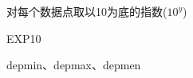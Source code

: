 \label{cmd:exp10}

对每个数据点取以10为底的指数($10^y$)

\begin{SACSTX}
EXP10
\end{SACSTX}

depmin、depmax、depmen

